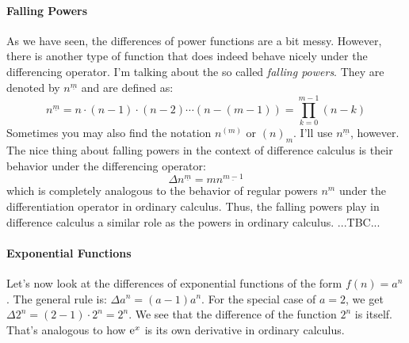 
\paragraph{Falling Powers}
As we have seen, the differences of power functions are a bit messy. However, there is another type of function that does indeed behave nicely under the differencing operator. I'm talking about the so called \emph{falling powers}. They are denoted by $n^{\underline{m}}$ and are defined as:
\begin{equation}
n^{\underline{m}}
= n \cdot (n-1) \cdot (n-2) \cdots (n-(m-1))
= \prod_{k=0}^{m-1} (n-k)
\end{equation}
Sometimes you may also find the notation $n^{(m)}$ or $(n)_m$. I'll use $n^{\underline{m}}$, however. The nice thing about falling powers in the context of difference calculus is their behavior under the differencing operator:
\begin{equation}
\Delta n^{\underline{m}} = m  n^{\underline{m-1}}
\end{equation}
which is completely analogous to the behavior of regular powers $n^m$ under the differentiation operator in ordinary calculus. Thus, the falling powers play in difference calculus a similar role as the powers in ordinary calculus. ...TBC...

%




\paragraph{Exponential Functions}
Let's now look at the differences of exponential functions of the form $f(n) = a^n$. The general rule is: $\Delta a^n = (a-1) a^n$. For the special case of $a=2$, we get $\Delta 2^n = (2-1) \cdot 2^n = 2^n$. We see that the difference of the function $2^n$ is itself. That's analogous to how $\operatorname{\mathrm{e}}^x$ is its own derivative in ordinary calculus.




